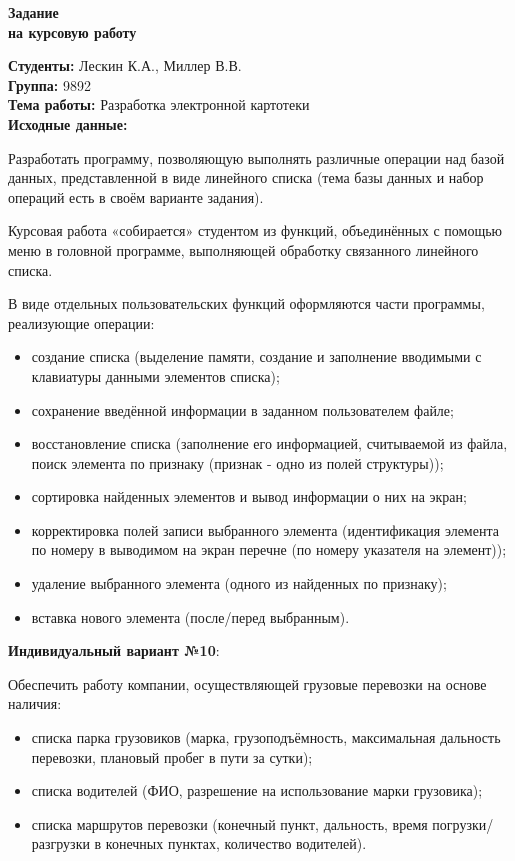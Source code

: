 \begin{center}
	\Large{
		\textbf{Задание\\ на курсовую работу}
	}
\end{center}

\textbf{Студенты:} Лескин К.А., Миллер В.В.\\

\textbf{Группа:} 9892\\

\textbf{Тема работы:} Разработка электронной картотеки\\

\textbf{Исходные данные:}

Разработать программу, позволяющую выполнять различные операции
над базой данных, представленной в виде линейного списка (тема базы
данных и набор операций есть в своём варианте задания).

Курсовая работа «собирается» студентом из функций, объединённых с
помощью меню в головной программе, выполняющей обработку связанного
линейного списка.

В виде отдельных пользовательских функций оформляются части
программы, реализующие операции:
\begin{itemize}
	\item создание списка (выделение памяти, создание и заполнение вводимыми с
	клавиатуры данными элементов списка);
	\item сохранение введённой информации в заданном пользователем файле;
	\item восстановление списка (заполнение его информацией, считываемой из
	файла, поиск элемента по признаку (признак - одно из полей структуры));
	\item сортировка найденных элементов и вывод информации о них на экран;
	\item корректировка полей записи выбранного элемента (идентификация
	элемента по номеру в выводимом на экран перечне (по номеру указателя
	на элемент));
	\item удаление выбранного элемента (одного из найденных по признаку);
	\item вставка нового элемента (после/перед выбранным).
\end{itemize}

\newpage

\textbf{Индивидуальный вариант №10}:

Обеспечить работу компании, осуществляющей грузовые
перевозки на основе наличия:

\begin{itemize}
	\item списка парка грузовиков (марка, грузоподъёмность, максимальная
	дальность перевозки, плановый пробег в пути за сутки);
	\item списка водителей (ФИО, разрешение на использование марки грузовика);
	\item списка маршрутов перевозки (конечный пункт, дальность, время
	погрузки/разгрузки в конечных пунктах, количество водителей).
\end{itemize}

